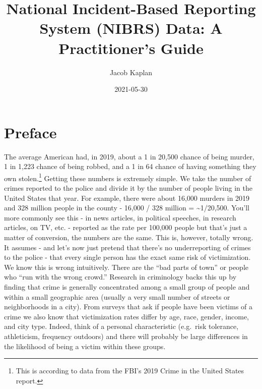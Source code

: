 \documentclass[
  12pt,
  openany]{book}
\title{National Incident-Based Reporting System (NIBRS) Data: A Practitioner's Guide}
\author{Jacob Kaplan}
\date{2021-05-30}
\begin{document}
\maketitle

{
\hypersetup{linkcolor=}
\setcounter{tocdepth}{2}
\tableofcontents
}
\listoffigures
{}
\hypertarget{preface}{%
\chapter{Preface}\label{preface}}

The average American had, in 2019, about a 1 in 20,500 chance of being murder, 1 in 1,223 chance of being robbed, and a 1 in 64 chance of having something they own stolen.\footnote{This is according to data from the FBI's 2019 Crime in the United States report.} Getting these numbers is extremely simple. We take the number of crimes reported to the police and divide it by the number of people living in the United States that year. For example, there were about 16,000 murders in 2019 and 328 million people in the county - 16,000 / 328 million = \textasciitilde1/20,500. You'll more commonly see this - in news articles, in political speeches, in research articles, on TV, etc. - reported as the rate per 100,000 people but that's just a matter of conversion, the numbers are the same. This is, however, totally wrong. It assumes - and let's now just pretend that there's no underreporting of crimes to the police - that every single person has the exact same risk of victimization. We know this is wrong intuitively. There are the ``bad parts of town'' or people who ``run with the wrong crowd.'' Research in criminology backs this up by finding that crime is generally concentrated among a small group of people and within a small geographic area (usually a very small number of streets or neighborhoods in a city). From surveys that ask if people have been victims of a crime we also know that victimization rates differ by age, race, gender, income, and city type. Indeed, think of a personal characteristic (e.g.~risk tolerance, athleticism, frequency outdoors) and there will probably be large differences in the likelihood of being a victim within these groups.
\end{document}
